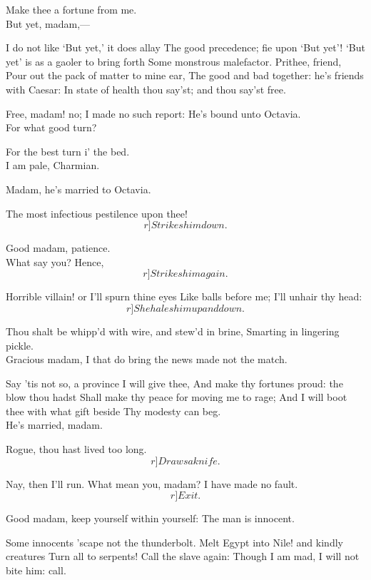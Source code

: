 \documentclass{book}
\begin{document}
\2	Make thee a fortune from me. \\

	But yet, madam,---

\2	I do not like `But yet,' it does allay
	The good precedence; fie upon `But yet'!
	`But yet' is as a gaoler to bring forth
	Some monstrous malefactor. Prithee, friend,
	Pour out the pack of matter to mine ear,
	The good and bad together: he's friends with Caesar:
	In state of health thou say'st; and thou say'st free.

	Free, madam! no; I made no such report:
	He's bound unto Octavia. \\

\2	For what good turn?

	For the best turn i' the bed. \\

\2	I am pale, Charmian.

	Madam, he's married to Octavia.

\2	The most infectious pestilence upon thee!
	\[r]Strikes him down.\]

	Good madam, patience. \\

\2	What say you? Hence,
	\[r]Strikes him again.\]

	Horrible villain! or I'll spurn thine eyes
	Like balls before me; I'll unhair thy head:
	\[r]She hales him up and down.\]

	Thou shalt be whipp'd with wire, and stew'd in brine,
	Smarting in lingering pickle. \\

	Gracious madam,
	I that do bring the news made not the match.

\2	Say 'tis not so, a province I will give thee,
	And make thy fortunes proud: the blow thou hadst
	Shall make thy peace for moving me to rage;
	And I will boot thee with what gift beside
	Thy modesty can beg. \\

	He's married, madam.

\2	Rogue, thou hast lived too long. \\ 	\[r]Draws a knife.\]

	Nay, then I'll run.
	What mean you, madam? I have made no fault.	\[r]Exit.\]

\7	Good madam, keep yourself within yourself:
	The man is innocent.

\2	Some innocents 'scape not the thunderbolt.
	Melt Egypt into Nile! and kindly creatures
	Turn all to serpents! Call the slave again:
	Though I am mad, I will not bite him: call.
\end{document}
